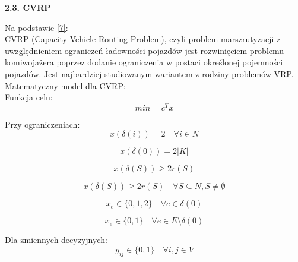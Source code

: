 \documentclass[a4paper, twoside, 12pt, justified]{article}
\begin{document}
	\begin{flushleft}
		\begin{large}
			\textbf{2.3. CVRP}
		\end{large}
	\end{flushleft}
	\vspace{5mm} %
	
	Na podstawie \hyperlink{cvrp-irnich}{[7]}:\\
	CVRP (Capacity Vehicle Routing Problem), czyli problem marszrutyzacji z uwzględnieniem ograniczeń ładowności pojazdów jest rozwinięciem problemu komiwojażera poprzez dodanie ograniczenia w postaci określonej pojemności pojazdów. Jest najbardziej studiowanym wariantem z rodziny problemów VRP. Matematyczny model dla CVRP:\\
	
	Funkcja celu:\\
	\begin{equation}
	{min= c^Tx}
	\end{equation}
	
	Przy ograniczeniach:\\
	\begin{equation}
	{x(\delta(i)) = 2 \quad \forall i \in N }
	\end{equation}
	
	\begin{equation}
	{x(\delta(0)) = 2|K| }
	\end{equation}
	
	\begin{equation}
	{x(\delta(S)) \geq 2r(S) }
	\end{equation}
	
	\begin{equation}
	{x(\delta(S)) \geq 2r(S) \quad \forall S \subseteq N, S \neq \emptyset}
	\end{equation}
	
	\begin{equation}
	{x_e \in \{0,1,2\} \quad \forall e \in \delta(0)}
	\end{equation}
	
	\begin{equation}
	{x_e \in \{0,1\} \quad \forall e \in E \setminus \delta(0)}
	\end{equation}
	
	
	Dla zmiennych decyzyjnych:\\
	
	\begin{equation}
	{ y_{ij} \in \{0,1\} \quad \forall i,j \in V }
	\end{equation}
	
\end{document}
